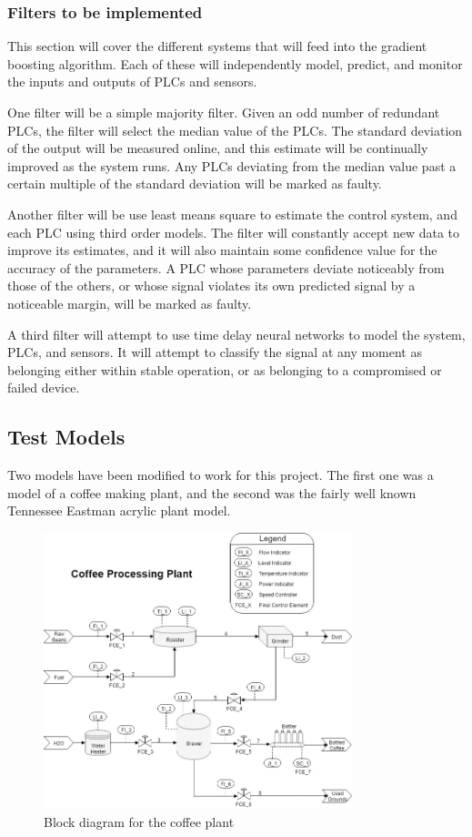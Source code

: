 \documentclass[10pt,twocolumn]{IEEEtran}
\begin{document}
\subsubsection{Filters to be implemented}
This section will cover the different systems that will feed into the gradient boosting algorithm.
Each of these will independently model, predict, and monitor the inputs and outputs of PLCs and sensors.

One filter will be a simple majority filter.
Given an odd number of redundant PLCs, the filter will select the median value of the PLCs.
The standard deviation of the output will be measured online, and this estimate will be continually improved as the system runs.
Any PLCs deviating from the median value past a certain multiple of the standard deviation will be marked as faulty.

Another filter will be use least means square to estimate the control system, and each PLC using third order models.
The filter will constantly accept new data to improve its estimates, and it will also maintain some confidence value for the accuracy of the parameters.
A PLC whose parameters deviate noticeably from those of the others, or whose signal violates its own predicted signal by a noticeable margin, will be marked as faulty.

A third filter will attempt to use time delay neural networks to model the system, PLCs, and sensors.
It will attempt to classify the signal at any moment as belonging either within stable operation, or as belonging to a compromised or failed device.

\subsection{Test Models}\label{sec:models}
Two models have been modified to work for this project.
The first one was a model of a coffee making plant, and the second was the fairly well known Tennessee Eastman acrylic plant model.

\begin{figure}
  \centering
  \includegraphics[width=0.8\textwidth]{coffee.png}
  \caption{Block diagram for the coffee plant}
  \label{fig:coffee}
\end{figure}
\end{document}
